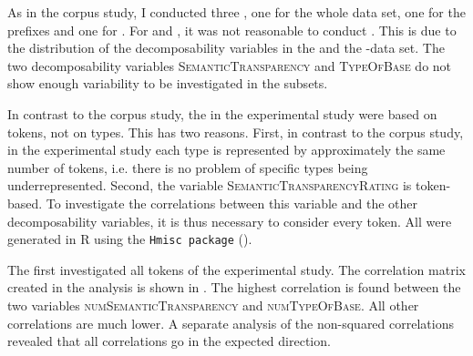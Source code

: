 As in the corpus study, I conducted three , one for the whole data set, one for the prefixes and one for .  
For  and , it was not reasonable to conduct . This is due to the distribution of the decomposability variables in the  and the -data set. The two decomposability variables \textsc{SemanticTransparency} and \textsc{TypeOfBase} do not show enough variability to be investigated in the subsets. 


 In contrast to the corpus study, the  in the experimental study were based on tokens, not on types. This has two reasons. First, in contrast to the corpus study, in the experimental study each type is represented by approximately the same number of tokens, i.e. there is no problem of specific types being underrepresented. Second, the variable \textsc{SemanticTransparencyRating} is token-based. To investigate the correlations between this variable and the other decomposability variables, it is thus necessary to consider every token.
All  were generated in R using the \texttt{Hmisc package} (\citealt{Harrell.2017}).

   The first  investigated all tokens of the experimental  study. The correlation matrix created in the analysis is shown in . 
   The highest correlation is found between the two variables \textsc{numSemanticTransparency} and \textsc{numTypeOfBase}. All other correlations are much lower. A separate analysis of the non-squared correlations revealed that all correlations go in the expected direction. 
   
   


